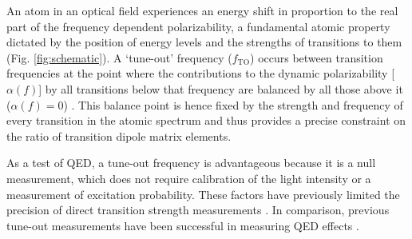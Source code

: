 \documentclass[aps,prl,
reprint,
superscriptaddress,
 amsmath,amssymb,
floatfix
]{revtex4-2}
\begin{document}
An atom in an optical field experiences an energy shift in proportion to the real part of the frequency dependent polarizability, a fundamental atomic property dictated by the position of energy levels and the strengths of transitions to them (Fig. \ref{fig:schematic}). 
A ‘tune-out’ frequency ($f_\mathrm{TO}$) occurs between transition frequencies at the point where the contributions to the dynamic polarizability [$\alpha(f)$] by all transitions below that frequency are balanced by all those above it ($\alpha(f)=0$) \cite{PhysRevA.75.053612}. 
This balance point is hence fixed by the strength and frequency of every transition in the atomic spectrum and thus provides a precise constraint on the ratio of transition dipole matrix elements. 

As a test of QED, a tune-out frequency is advantageous because it is a null measurement, which does not require calibration of the light intensity or a measurement of excitation probability. These factors have previously limited the precision of direct transition strength measurements \cite{Bouloufa_2009,Vogt2007,PhysRevLett.125.013002}. In comparison, previous tune-out measurements have been successful in measuring QED effects \cite{PhysRevA.92.052501,PhysRevLett.109.243004,PhysRevA.93.022507,PhysRevLett.109.243003,PhysRevLett.115.043004}.
\end{document}
